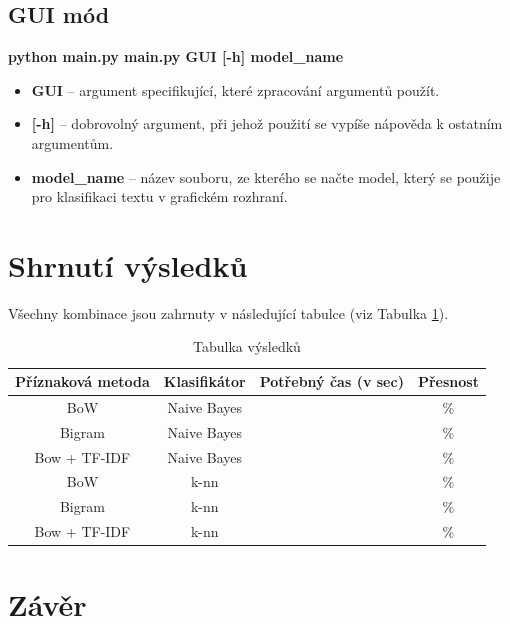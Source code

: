 \documentclass[12pt]{article}
\begin{document}
\subsection{GUI mód}
\textbf{python main.py main.py GUI [-h] model\_name}
\begin{itemize}
	\item \textbf{GUI} -- argument specifikující, které zpracování argumentů
		použít.
	\item \textbf{[-h]} -- dobrovolný argument, při jehož použití se vypíše
		nápověda k ostatním argumentům.
	\item \textbf{model\_name} -- název souboru, ze kterého se načte model,
		který se použije pro klasifikaci textu v grafickém rozhraní.
\end{itemize}
%
%
\section{Shrnutí výsledků}
Všechny kombinace jsou zahrnuty v následující tabulce (viz Tabulka
\ref{tab:results}).

\begin{table}[H]
        \begin{tabular}{| c | c | c | c |}
                \hline
                Příznaková metoda & Klasifikátor & Potřebný čas (v sec) & Přesnost\\
                \hline
			BoW & Naive Bayes &  & \% \\
                \hline
                Bigram & Naive Bayes &  & \% \\
                \hline
                Bow + TF-IDF & Naive Bayes &  & \% \\
                \hline
                BoW & k-nn &  & \% \\
                \hline
                Bigram & k-nn &  & \% \\
                \hline
                Bow + TF-IDF & k-nn &  & \% \\
                \hline
        \end{tabular}
\caption{Tabulka výsledků}
\label{tab:results}
\end{table}

%
%
\section{Závěr}
%
\end{document}
